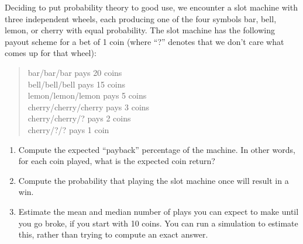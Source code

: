 \begin{uexercise}
Deciding to put probability theory to good use, we encounter
a slot machine with three independent wheels, each
producing one of the four symbols {\sc bar}, {\sc bell}, {\sc lemon}, or {\sc cherry} with
equal probability.  The slot machine has the following payout scheme
for a bet of 1 coin (where ``?'' denotes that we don't care what
comes up for that wheel):
%
\begin{verse}
      {\sc bar}/{\sc bar}/{\sc bar}  pays 20 coins \\
      {\sc bell}/{\sc bell}/{\sc bell}  pays 15 coins\\
      {\sc lemon}/{\sc lemon}/{\sc lemon} pays 5 coins\\
      {\sc cherry}/{\sc cherry}/{\sc cherry} pays 3 coins\\
      {\sc cherry}/{\sc cherry}/? pays 2 coins\\
      {\sc cherry}/?/? pays 1 coin
\end{verse}
%
\begin{enumerate}
\item Compute the expected ``payback'' percentage of the machine.  In
other words, for each coin played, what is the expected coin return?
\item Compute the probability that playing the slot machine once
will result in a win.
\item Estimate the mean and median number of plays you can expect to
make until you go broke, if you start with 10 coins.  You can run a
simulation to estimate this, rather than trying to compute an exact
answer.
\end{enumerate}
\end{uexercise} 

